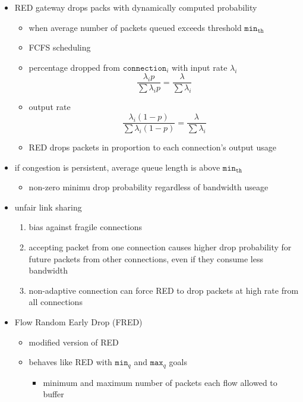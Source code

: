 \begin{itemize}
    \item RED gateway drops packs with dynamically computed probability
    \begin{itemize}
        \item when average number of packets queued exceeds threshold $\texttt{min}_{\texttt{th}}$
        \item FCFS scheduling
        \item percentage dropped from $\texttt{connection}_i$ with input rate $\lambda_i$
        \[\frac{\lambda_i p}{\sum \lambda_i p} = \frac{\lambda}{\sum \lambda_i}\]
        \item output rate
        \[\frac{\lambda_i (1-p)}{\sum \lambda_i (1-p)} = \frac{\lambda}{\sum \lambda_i}\]
        \item RED drops packets in proportion to each connection's output usage
    \end{itemize}
    \item if congestion is persistent, average queue length is above $\texttt{min}_{\texttt{th}}$
    \begin{itemize}
        \item non-zero minimu drop probability regardless of bandwidth useage
    \end{itemize}
    \item unfair link sharing
    \begin{enumerate}
        \item bias against fragile connections
        \item accepting packet from one connection causes higher drop
        probability for future packets from other connections, even if they
        consume less bandwidth
        \item non-adaptive connection can force RED to drop packets at high rate
        from all connections
    \end{enumerate}
    \item Flow Random Early Drop (FRED)
    \begin{itemize}
        \item modified version of RED
        \item behaves like RED with $\texttt{min}_q$ and $\texttt{max}_q$ goals
        \begin{itemize}
            \item minimum and maximum number of packets each flow allowed to buffer

\end{itemize}
\end{itemize}
\end{itemize}
